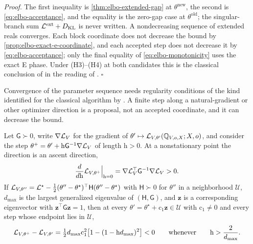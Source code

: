 \noindent\emph{Proof.}
The first inequality is \cref{thm:elbo-extended-gap} at $\theta^{\mathrm{new}}$,
the second is \eqref{eq:elbo-acceptance}, and the equality is the zero-gap case
at $\theta^{\mathrm{old}}$; the singular-branch sum $\mathcal L^{\mathrm{ext}}+D_{\mathrm{KL}}$
is never written. A nondecreasing sequence of extended reals converges. Each
block coordinate does not decrease the bound by
\cref{prop:elbo-exact-e-coordinate}, and each accepted step does not decrease it
by \eqref{eq:elbo-acceptance}; only the final equality of
\eqref{eq:elbo-monotonicity} uses the exact E phase. Under (H3)--(H4) at both
candidates this is the classical conclusion of \citet{Dempster1977} in the
reading of \citet{Neal1998}. \hfill$\square$

Convergence of the parameter sequence needs regularity conditions of the kind
identified for the classical algorithm by \citet{Wu1983}. A finite step along a
natural-gradient or other optimizer direction is a proposal, not an accepted
coordinate, and it can decrease the bound.

Let $\mathsf G\succ0$, write $\nabla\mathcal L_V$ for the gradient of
$\theta'\mapsto\mathcal L_{V,\theta'}(\mathbb Q_{V,o,X};X,o)$, and consider the step
$\theta^+=\theta'+\mathrm h\mathsf G^{-1}\nabla\mathcal L_V$ of length
$\mathrm h>0$. At a nonstationary point the direction is an ascent direction,
\begin{equation}
\frac{d}{d\mathrm h}\mathcal L_{V,\theta^+}\Big|_{\mathrm h=0}
=\nabla\mathcal L_V^{\top}\mathsf G^{-1}\nabla\mathcal L_V>0.
\label{eq:elbo-ascent-direction}
\end{equation}
If $\mathcal L_{V,\theta''}=\mathcal L^\star-\tfrac12(\theta''-\theta^\star)^\top\mathsf H(\theta''-\theta^\star)$
with $\mathsf H\succ0$ for $\theta''$ in a neighborhood $\mathcal U$, $d_{\max}$
is the largest generalized eigenvalue of $(\mathsf H,\mathsf G)$, and
$\mathbf z$ is a corresponding eigenvector with
$\mathbf z^\top\mathsf G\mathbf z=1$, then at every
$\theta'=\theta^\star+\mathrm c_1\mathbf z\in\mathcal U$ with $\mathrm c_1\ne0$
and every step whose endpoint lies in $\mathcal U$,
\begin{equation}
\mathcal L_{V,\theta^+}-\mathcal L_{V,\theta'}
=\tfrac12d_{\max}\mathrm c_1^2\bigl[1-(1-\mathrm hd_{\max})^2\bigr]<0
\qquad\text{whenever}\qquad
\mathrm h>\frac{2}{d_{\max}}.
\label{eq:elbo-step-size-failure}
\end{equation}

